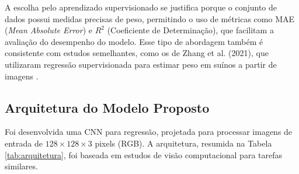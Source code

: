 \documentclass[sigconf,nonacm,screen]{acmart}
\begin{document}
A escolha pelo aprendizado supervisionado se justifica porque o conjunto de dados possui medidas precisas de peso, permitindo o uso de métricas como MAE (\textit{Mean Absolute Error}) e $R^2$ (Coeficiente de Determinação), que facilitam a avaliação do desempenho do modelo. Esse tipo de abordagem também é consistente com estudos semelhantes, como os de Zhang et al. (2021)\cite{Zhang2021}, que utilizaram regressão supervisionada para estimar peso em suínos a partir de imagens .

\vspace{0.3cm}

\subsection{Arquitetura do Modelo Proposto}
Foi desenvolvida uma CNN para regressão, projetada para processar imagens de entrada de $128 \times 128 \times 3$ pixels (RGB). A arquitetura, resumida na Tabela \ref{tab:arquitetura}, foi baseada em estudos de visão computacional para tarefas similares.
\end{document}
